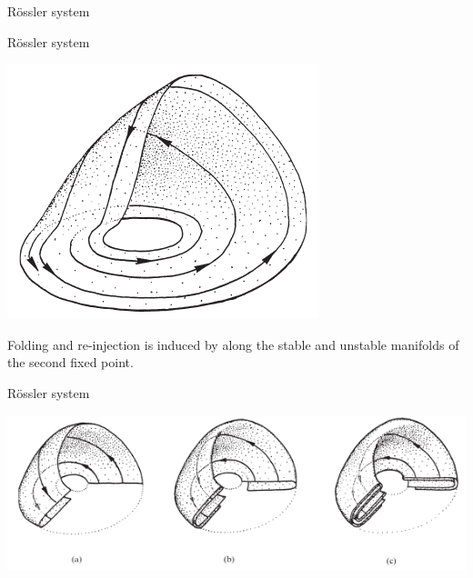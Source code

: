 \documentclass[usenames, dvipsnames, aspectratio=169]{beamer}
\begin{document}
{\begin{frame}[t, c]{R\"ossler system}{}
    \vfill
  \end{frame}


  \begin{frame}[t, c]{R\"ossler system}{}
    \vfill
    \large

    \begin{minipage}{.38\textwidth}
      \centering
      \includegraphics[width=\textwidth]{rossler_schematic}
    \end{minipage}%
    \hfill
    \begin{minipage}{.58\textwidth}
      Folding and re-injection is induced by along the stable and unstable manifolds of the second fixed point.
    \end{minipage}

    \vfill
  \end{frame}

  \begin{frame}[t, c]{R\"ossler system}{}
    \vfill
    \centering

    \includegraphics[width=.8\textwidth]{rossler_cantor_set}
    \vfill
  \end{frame}

}
\end{document}
